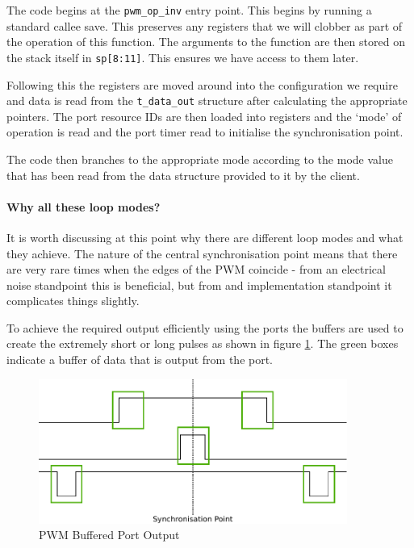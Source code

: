 The code begins at the \verb=pwm_op_inv= entry point. This begins by running a standard callee save. This preserves any registers that we will clobber as part of the operation of this function. The arguments to the function are then stored on the stack itself in \verb=sp[8:11]=. This ensures we have access to them later.

Following this the registers are moved around into the configuration we require and data is read from the \verb=t_data_out= structure after calculating the appropriate pointers. The port resource IDs are then loaded into registers and the `mode' of operation is read and the port timer read to initialise the synchronisation point.

The code then branches to the appropriate mode according to the mode value that has been read from the data structure provided to it by the client.

\paragraph{Why all these loop modes?} It is worth discussing at this point why there are different loop modes and what they achieve. The nature of the central synchronisation point means that there are very rare times when the edges of the PWM coincide - from an electrical noise standpoint this is beneficial, but from and implementation standpoint it complicates things slightly.

To achieve the required output efficiently using the ports the buffers are used to create the extremely short or long pulses as shown in figure \ref{fig_PwmPortBuffering}. The green boxes indicate a buffer of data that is output from the port.

\begin{figure}[h]
\begin{center}
\includegraphics[width=0.9\textwidth]{images/bufferedPWM.pdf}
\caption{PWM Buffered Port Output}
\label{fig_PwmPortBuffering}
\end{center}
\end{figure}

